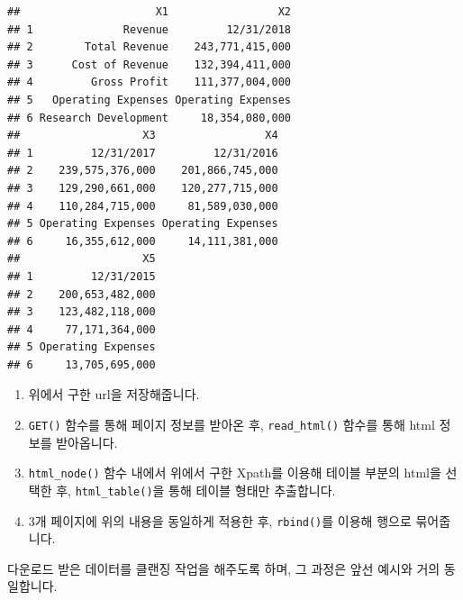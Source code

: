 \documentclass[12pt,]{book}
\providecommand{\tightlist}{%
  \setlength{\itemsep}{0pt}\setlength{\parskip}{0pt}}
\begin{document}
\begin{verbatim}
##                     X1                 X2
## 1              Revenue         12/31/2018
## 2        Total Revenue    243,771,415,000
## 3      Cost of Revenue    132,394,411,000
## 4         Gross Profit    111,377,004,000
## 5   Operating Expenses Operating Expenses
## 6 Research Development     18,354,080,000
##                   X3                 X4
## 1         12/31/2017         12/31/2016
## 2    239,575,376,000    201,866,745,000
## 3    129,290,661,000    120,277,715,000
## 4    110,284,715,000     81,589,030,000
## 5 Operating Expenses Operating Expenses
## 6     16,355,612,000     14,111,381,000
##                   X5
## 1         12/31/2015
## 2    200,653,482,000
## 3    123,482,118,000
## 4     77,171,364,000
## 5 Operating Expenses
## 6     13,705,695,000
\end{verbatim}

\begin{enumerate}
\def\labelenumi{\arabic{enumi}.}
\tightlist
\item
  위에서 구한 url을 저장해줍니다.
\item
  \texttt{GET()} 함수를 통해 페이지 정보를 받아온 후, \texttt{read\_html()} 함수를 통해 html 정보를 받아옵니다.
\item
  \texttt{html\_node()} 함수 내에서 위에서 구한 Xpath를 이용해 테이블 부분의 html을 선택한 후, \texttt{html\_table()}을 통해 테이블 형태만 추출합니다.
\item
  3개 페이지에 위의 내용을 동일하게 적용한 후, \texttt{rbind()}를 이용해 행으로 묶어줍니다.
\end{enumerate}

다운로드 받은 데이터를 클랜징 작업을 해주도록 하며, 그 과정은 앞선 예시와 거의 동일합니다.
\end{document}
